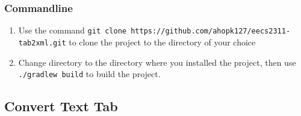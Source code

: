 \documentclass[11pt]{article}
\begin{document}
\subsubsection{Commandline}
\label{sec:orgce43265}
\begin{enumerate}
\item Use the command \texttt{git clone https://github.com/ahopk127/eecs2311-tab2xml.git} to clone the project to the directory of your choice
\item Change directory to the directory where you installed the project, then use \texttt{./gradlew build} to build the project.
\end{enumerate}
\subsection{Convert Text Tab}
\label{sec:org7bda3dc}
\end{document}
